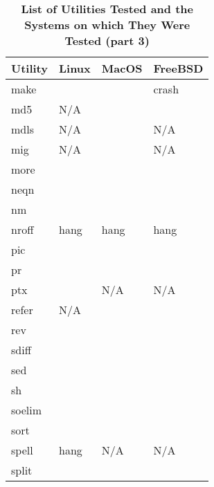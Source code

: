 \begin{table}[htbp]  %
\renewcommand\thetable{1}
\centering  %
 \begin{tabular}{|p{2.5cm}|p{2cm}|p{2cm}|p{2cm}|} 
     \hline
     \hline
        Utility & Linux & MacOS & FreeBSD \\ %
       \hline
       make &   &   & crash   \\
       md5 & N/A  &   &    \\
       mdls & N/A  &   & N/A   \\
       mig & N/A  &   & N/A   \\
       more &   &   &    \\
       neqn &   &   &    \\
       nm &   &   &    \\
       nroff & hang  & hang  & hang \\
       pic &   &   &    \\
       pr &   &   &    \\
       ptx &   & N/A  & N/A   \\
       refer & N/A  &   &    \\
       rev &   &   &    \\
       sdiff &   &   &    \\
       sed &   &   &    \\
       sh &   &   &    \\
       soelim &   &   &    \\
       sort &   &   &    \\
       spell & hang  & N/A  & N/A   \\
       split &   &   &    \\
       \hline
       \hline
   \end{tabular}
   \caption{\textbf{List of Utilities Tested and the Systems on which They Were Tested (part 3)}}  %
\end{table}



